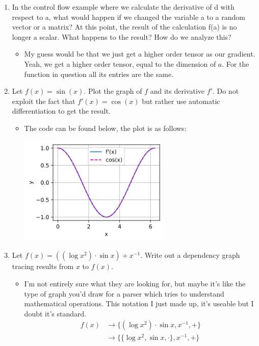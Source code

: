 \documentclass{article}
\begin{document}
\begin{enumerate}
\item In the control flow example where we calculate the derivative of d with respect to a, what would happen if we changed the variable a to a random vector or a matrix? At this point, the result of the calculation f(a) is no longer a scalar. What happens to the result? How do we analyze this?
	\begin{itemize}
		\item My guess would be that we just get a higher order tensor as our gradient. Yeah, we get a higher order tensor, equal to the dimension of $a$. For the function in question all its entries are the same.
	\end{itemize}
\item Let $f(x) = \sin(x)$. Plot the graph of $f$ and its derivative $f'$. Do not exploit the fact that $f'(x) = \cos(x)$ but rather use automatic differentiation to get the result.
	\begin{itemize}
		\item The code can be found below, the plot is as follows:
		\begin{center}
		\includegraphics[width=0.6\textwidth]{Images/2_5_4.png}
		\end{center}
	\end{itemize}
\item Let $f(x) = ((\log x^2) \cdot \sin x) + x^{-1}$. Write out a dependency graph tracing results from $x$ to $f(x)$.
	\begin{itemize}
		\item I'm not entirely sure what they are looking for, but maybe it's like the type of graph you'd draw for a parser which tries to understand mathematical operations. This notation I just made up, it's useable but I doubt it's standard.
		$$
		\begin{aligned}
		f(x) &\rightarrow \{(\log x^2) \cdot \sin x, x^{-1}, +\} \\
		&\rightarrow \{\{\log x^2, \sin x, \cdot\}, x^{-1}, +\} \\

\end{aligned}$$
\end{itemize}
\end{enumerate}
\end{document}
